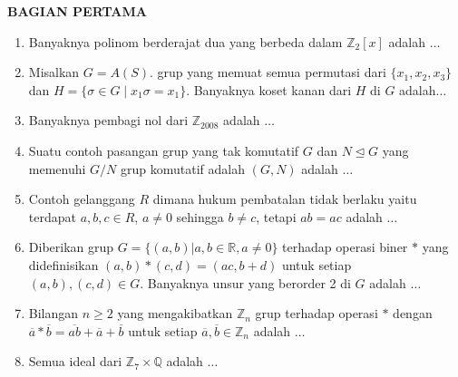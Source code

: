 \documentclass[12pt,twoside]{article}
\begin{document}
\textbf{BAGIAN PERTAMA}
\begin{enumerate}
	\item Banyaknya polinom berderajat dua yang berbeda dalam $\mathbb{Z}_2[x]$ adalah $\dots$


	\item Misalkan $G=A(S)$. grup yang memuat semua permutasi dari $\{x_1,x_2,x_3\}$ dan $H=\{\sigma\in G\mid x_1\sigma=x_1\}$. Banyaknya koset kanan dari $H$ di $G$ adalah$\dots$

	\item Banyaknya pembagi nol dari $\mathbb{Z}_{2008}$ adalah $\dots$

	\item Suatu contoh pasangan grup yang tak komutatif $G$ dan $N\trianglelefteq G$ yang memenuhi $G/N$ grup komutatif adalah $(G,N)$ adalah $\dots$

	\item Contoh gelanggang $R$ dimana hukum pembatalan tidak berlaku yaitu terdapat $a,b,c\in R$, $a\neq 0$ sehingga $b\neq c$, tetapi $ab=ac$ adalah $\dots$

	\item Diberikan grup $G=\{(a,b)|a,b\in \mathbb{R},a\neq 0\}$ terhadap operasi biner $\ast$ yang didefinisikan $(a,b)\ast(c,d)=(ac,b+d)$ untuk setiap $(a,b),(c,d)\in G$. Banyaknya unsur yang berorder 2 di $G$ adalah $\dots$

	\item Bilangan $n\geq 2$ yang mengakibatkan $\mathbb{Z}_n$ grup terhadap operasi $\ast $ dengan $\overline{a}\ast\overline{b}=\overline{ab}+\overline{a}+\overline{b}$ untuk setiap $\overline{a},\overline{b}\in \mathbb{Z}_n$ adalah $\dots$

	\item Semua ideal dari $\mathbb{Z}_7\times\mathbb{Q}$ adalah $\dots$

\end{enumerate}
\end{document}
